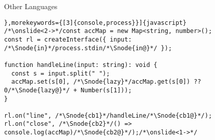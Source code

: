 {\begin{frame}[fragile]{Other Languages}
\begin{layout-imageonly}
\vspace*{-\baselineskip}
   \begin{verbatim}},morekeywords={[3]{console,process}}]{javascript}
/*\onslide<2->*/const accMap = new Map<string, number>();
const rl = createInterface({ input: /*\Snode{in}*/process.stdin/*\Snode{in@}*/ });

function handleLine(input: string): void {
  const s = input.split(" ");
  accMap.set(s[0], /*\Snode{lazy}*/accMap.get(s[0]) ?? 0/*\Snode{lazy@}*/ + Number(s[1]));
}

rl.on("line", /*\Snode{cb1}*/handleLine/*\Snode{cb1@}*/);
rl.on("close", /*\Snode{cb2}*/() => console.log(accMap)/*\Snode{cb2@}*/);/*\onslide<1->*/
   \end{verbatim}
\end{layout-imageonly}
\end{frame}

{

}}
